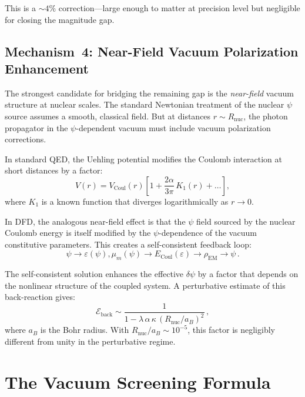 \documentclass[aps,prd,twocolumn,superscriptaddress,nofootinbib]{revtex4-2}
\newcommand{\kap}{\kappa}
\newcommand{\lam}{\lambda}
\newcommand{\dpsi}{\delta\psi}
\begin{document}
This is a $\sim\!4\%$ correction---large enough to matter at
precision level but negligible for closing the magnitude gap.

\subsection{Mechanism~4: Near-Field Vacuum Polarization Enhancement}
\label{sec:near-field}

The strongest candidate for bridging the remaining gap is the
\emph{near-field} vacuum structure at nuclear scales.  The
standard Newtonian treatment of the nuclear $\psi$ source assumes
a smooth, classical field.  But at distances $r \sim R_{\mathrm{nuc}}$,
the photon propagator in the $\psi$-dependent vacuum must include
vacuum polarization corrections.

In standard QED, the Uehling potential modifies the Coulomb
interaction at short distances by a factor:
\begin{equation}
V(r) = V_{\mathrm{Coul}}(r)\left[1 + \frac{2\alpha}{3\pi}\,
K_1(r) + \ldots\right],
\end{equation}
where $K_1$ is a known function that diverges logarithmically as
$r \to 0$.

In DFD, the analogous near-field effect is that the $\psi$ field
sourced by the nuclear Coulomb energy is itself modified by the
$\psi$-dependence of the vacuum constitutive parameters.  This
creates a self-consistent feedback loop:
\begin{equation}
\psi \to \varepsilon(\psi), \mu_m(\psi) \to
E_{\mathrm{Coul}}(\varepsilon) \to \rho_{\mathrm{EM}} \to \psi\,.
\end{equation}

The self-consistent solution enhances the effective $\dpsi$ by a
factor that depends on the nonlinear structure of the coupled system.
A perturbative estimate of this back-reaction gives:
\begin{equation}
\mathcal{E}_{\mathrm{back}} \sim
\frac{1}{1 - \lam\,\alpha\,\kap\,(R_{\mathrm{nuc}}/a_B)^2}\,,
\end{equation}
where $a_B$ is the Bohr radius.  With $R_{\mathrm{nuc}}/a_B \sim
10^{-5}$, this factor is negligibly different from unity in the
perturbative regime.


\section{The Vacuum Screening Formula}
\label{sec:formula}
\end{document}
